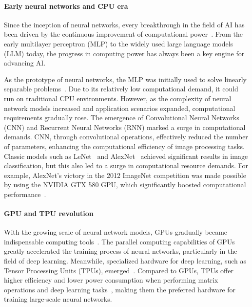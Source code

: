 \paragraph{Early neural networks and CPU era}
Since the inception of neural networks, every breakthrough in the field of AI has been driven by the continuous improvement of computational power~\cite{thompson2020computational}. From the early multilayer perceptron (MLP) to the widely used large language models (LLM) today, the progress in computing power has always been a key engine for advancing AI.

As the prototype of neural networks, the MLP was initially used to solve linearly separable problems~\cite{rosenblatt1958perceptron}. Due to its relatively low computational demand, it could run on traditional CPU environments. However, as the complexity of neural network models increased and application scenarios expanded, computational requirements gradually rose. The emergence of Convolutional Neural Networks (CNN) and Recurrent Neural Networks (RNN) marked a surge in computational demands. CNN, through convolutional operations, effectively reduced the number of parameters, enhancing the computational efficiency of image processing tasks. Classic models such as LeNet~\cite{lecun1998gradient} and AlexNet~\cite{krizhevsky2012imagenet} achieved significant results in image classification, but this also led to a surge in computational resource demands. For example, AlexNet's victory in the 2012 ImageNet competition was made possible by using the NVIDIA GTX 580 GPU, which significantly boosted computational performance~\cite{krizhevsky2012imagenet}.

\paragraph{GPU and TPU revolution}
With the growing scale of neural network models, GPUs gradually became indispensable computing tools~\cite{raina2009large}. The parallel computing capabilities of GPUs greatly accelerated the training process of neural networks, particularly in the field of deep learning. Meanwhile, specialized hardware for deep learning, such as Tensor Processing Units (TPUs), emerged~\cite{jouppi2017datacenter}. Compared to GPUs, TPUs offer higher efficiency and lower power consumption when performing matrix operations and deep learning tasks~\cite{wang2019benchmarking}, making them the preferred hardware for training large-scale neural networks.

